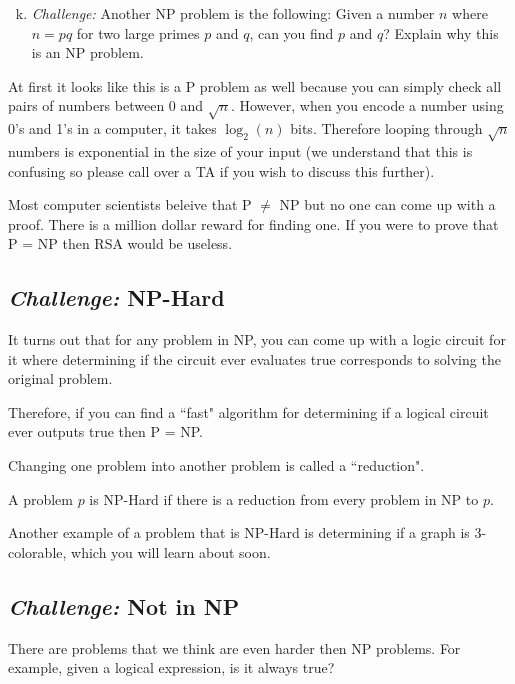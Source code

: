 \documentclass[12pt,letterpaper]{article}
\begin{document}
		\begin{enumerate}[a.]
		\setcounter{enumi}{10}
		\item \textit{Challenge:} Another NP problem is the following: Given a number $n$ where $n=pq$ for two large primes $p$ and $q$, can you find $p$ and $q$? Explain why this is an NP problem.

		\begin{mdframed}
		\vspace{3cm}
		\end{mdframed}
	\end{enumerate}
	At first it looks like this is a P problem as well because you can simply check all pairs of numbers between 0 and $\sqrt{n}$. However, when you encode a number using 0's and 1's in a computer, it takes $\log_2(n)$ bits. Therefore looping through $\sqrt{n}$ numbers is exponential in the size of your input (we understand that this is confusing so please call over a TA if you wish to discuss this further).
	
	Most computer scientists beleive that P $\not=$ NP but no one can come up with a proof. There is a million dollar reward for finding one. If you were to prove that P = NP then RSA would be useless. 

	\subsection*{\textit{Challenge:} NP-Hard}

	It turns out that for any problem in NP, you can come up with a logic circuit for it where determining if the circuit ever evaluates true corresponds to solving the original problem.

	Therefore, if you can find a ``fast" algorithm for determining if a logical circuit ever outputs true then P = NP.

	Changing one problem into another problem is called a ``reduction".

	A problem $p$ is NP-Hard if there is a reduction from every problem in NP to $p$.

	Another example of a problem that is NP-Hard is determining if a graph is 3-colorable, which you will learn about soon.

	\subsection*{\textit{Challenge:} Not in NP}

	There are problems that we think are even harder then NP problems. For example, given a logical expression, is it always true?
  
\end{document}
